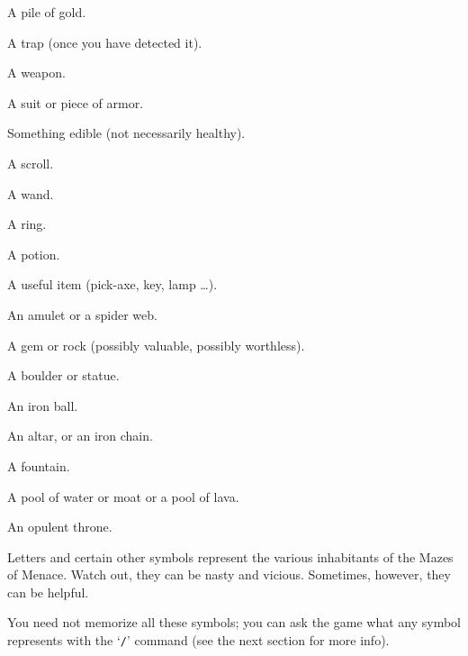 \item[\tb{\$}]
A pile of gold.

\item[\tb{\^{}}]
A trap (once you have detected it).

\item[\tb{)}]
A weapon.

\item[\tb{[}]
A suit or piece of armor.

\item[\tb{\%}]
Something edible (not necessarily healthy).

\item[\tb{?}]
A scroll.

\item[\tb{/}]
A wand.

\item[\tb{=}]
A ring.

\item[\tb{!}]
A potion.

\item[\tb{(}]
A useful item (pick-axe, key, lamp \ldots).

\item[\tb{"}]
An amulet or a spider web.

\item[\tb{*}]
A gem or rock (possibly valuable, possibly worthless).

\item[\tb{`}]
A boulder or statue.

\item[\tb{0}]
An iron ball.

\item[\tb{_}]
An altar, or an iron chain.

\item[\tb{\{}]
A fountain.

\item[\tb{\}}]
A pool of water or moat or a pool of lava.

\item[\tb{$\backslash$}]
An opulent throne.

\item[\tb{{\rm a}-{\rm zA}-{\rm Z} {\rm and} {\rm other} {\rm symbols}}]
Letters and certain other symbols represent the various inhabitants
of the Mazes of Menace.  Watch out, they can be nasty and vicious.
Sometimes, however, they can be helpful.
\elist
\nd %

You need not memorize all these symbols; you can ask the game what any
symbol represents with the `{\tt /}' command (see the next section for
more info).

